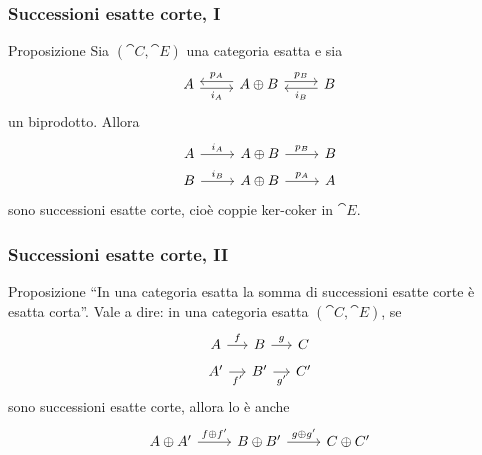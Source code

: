 \documentclass{beamer}
\begin{document}
\begin{frame}[fragile]
  \frametitle{Successioni esatte corte, I}
  
  \begin{block}{Proposizione}
    Sia \((\cat C,\cat E)\) una categoria esatta e sia
    \[
      \begin{tikzcd}
        A \ar["{i_A}", r, shift right, swap] & A \oplus B \ar["{p_A}",
        l, shift right, swap] \ar["{p_B}", r, shift left] & B
        \ar["{i_B}", l, shift left]
      \end{tikzcd}
    \]
    un biprodotto. Allora
    \[
      \begin{tikzcd}[row sep=tiny]
        A \ar["{i_A}", r] & A \oplus B \ar["{p_B}", r] & B \\
        B \ar["{i_B}", r] & A \oplus B \ar["{p_A}", r] & A
      \end{tikzcd}
    \]
    sono successioni esatte corte, cioè coppie ker-coker in \(\cat E\).
  \end{block}
  
\end{frame}

\begin{frame}[fragile]
  \frametitle{Successioni esatte corte, II}

  \begin{block}{Proposizione}
    ``In una categoria esatta la somma di successioni esatte corte è
    esatta corta''. Vale a dire: in una categoria esatta
    \((\cat C,\cat E)\), se
    \[
      \begin{tikzcd}[row sep=tiny, column sep=small]
        A \ar["{f}", r] & B \ar["{g}", r] & C \\
        A' \ar["{f'}", r, swap] & B' \ar["{g'}", r, swap] & C'
      \end{tikzcd}
    \]
    sono successioni esatte corte, allora lo è anche
    \[
      \begin{tikzcd}[row sep=small]
        A \oplus A' \ar["{f \oplus f'}", r] & B \oplus B' \ar["{g \oplus
          g'}", r] & C \oplus C'
      \end{tikzcd}
    \]
  \end{block}
  
\end{frame}
\end{document}
